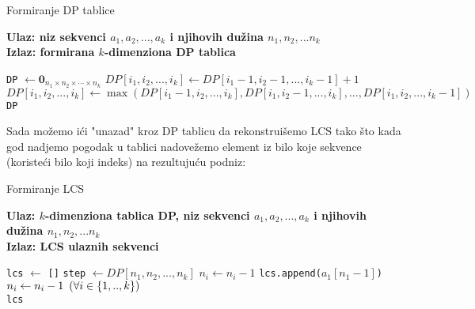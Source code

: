 \documentclass{article}
\begin{document}
    \begin{algorithm}
        \caption{Formiranje DP tablice}
        \hspace*{\algorithmicindent} \textbf{Ulaz: niz sekvenci $a_1,a_2,...,a_k$ i njihovih dužina $n_1, n_2,...n_k$} \\
        \hspace*{\algorithmicindent} \textbf{Izlaz: formirana $k$-dimenziona DP tablica}
        \begin{algorithmic}
            \State \texttt{DP} $\gets \mathbf{0}_{n_1 \times n_2 \times \cdots \times n_k}$
                    \State $DP[i_1, i_2, ... , i_k] \gets DP[i_1-1, i_2-1, ... , i_k-1] + 1$
                \Else
                    \State $DP[i_1, i_2, ... , i_k] \gets \max{(DP[i_1-1, i_2, ... , i_k], DP[i_1, i_2-1, ... , i_k], ..., DP[i_1, i_2, ... , i_k-1])}$
                \EndIf
            \EndFor \\
            \Return \texttt{DP}
        \end{algorithmic}
    \end{algorithm}

    Sada možemo ići "unazad" kroz DP tablicu da rekonstruišemo LCS tako što kada god nadjemo pogodak u tablici nadovežemo element iz bilo koje sekvence (koristeći bilo koji indeks) na rezultujuću podniz:

    \begin{algorithm}
        \caption{Formiranje LCS}
        \hspace*{\algorithmicindent} \textbf{Ulaz: $k$-dimenziona tablica DP, niz sekvenci $a_1,a_2,...,a_k$ i njihovih dužina $n_1, n_2,...n_k$} \\
        \hspace*{\algorithmicindent} \textbf{Izlaz: LCS ulaznih sekvenci}
        \begin{algorithmic}
            \State \texttt{lcs} $\gets$ \texttt{[]}
                \State \texttt{step} $\gets DP[n_1, n_2, ..., n_k]$
                    \State $n_i \gets n_i-1$
                \Else
                    \State \texttt{lcs.append($a_1[n_1 - 1]$)}
                    \State $n_i \gets n_i - 1  \hspace{0.5em} (\forall i \in \{1,..,k\})$
                \EndIf
            \EndWhile \\
            \Return \texttt{lcs}
        \end{algorithmic}
    \end{algorithm}
\end{document}
